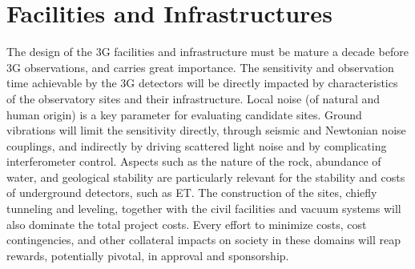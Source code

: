 \chapter{Facilities and Infrastructures}
\label{sec:Fac_Inf}
\vspace{-1cm}
The design of the 3G facilities and infrastructure must be mature a decade before 3G observations, and carries great importance. The sensitivity and observation time achievable by the 3G detectors will be directly impacted by characteristics of the observatory sites and their infrastructure. Local noise (of natural and human origin) is a key parameter for evaluating candidate sites. Ground vibrations will limit the sensitivity directly, through seismic and Newtonian noise couplings, and indirectly by driving scattered light noise and by complicating interferometer control. Aspects such as the nature of the rock, abundance of water, and geological stability are particularly relevant for the stability and costs of underground detectors, such as ET. The construction of the sites, chiefly tunneling and leveling, together with the civil facilities and vacuum systems will also dominate the total project costs. Every effort to minimize costs, cost contingencies, and other collateral impacts on society in these domains will reap rewards, potentially pivotal, in approval and sponsorship.

% 


